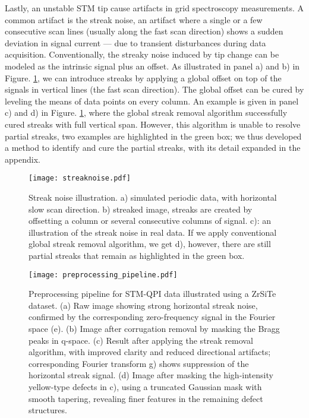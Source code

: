 Lastly, an unstable \ac{STM} tip cause artifacts in grid spectroscopy measurements. A common  artifact is the streak noise, an artifact where a single or a few consecutive scan lines (usually along the fast scan direction) shows a sudden deviation in signal current — due to transient disturbances during data acquisition. Conventionally, the streaky noise induced by tip change can be modeled as the intrinsic signal plus an offset. As illustrated in panel a) and b) in Figure. \ref{fig:streaks}, we can introduce streaks by applying a global offset on top of the signals in vertical lines (the fast scan direction). The global offset can be cured by leveling the means of data points on every column. An example is given in panel c) and d) in Figure. \ref{fig:streaks}, where the global streak removal algorithm successfully cured streaks with full vertical span. However, this algorithm is unable to resolve partial streaks, two examples are highlighted in the green box; we thus developed a method to identify and cure the partial streaks, with its detail expanded in the appendix.

\begin{figure}
	\texttt{[image: streaknoise.pdf]} 
	\centering
	\caption{Streak noise illustration. a) simulated periodic data, with horizontal slow scan direction. b) streaked image, streaks are created by offsetting a column or several consecutive columns of signal. c): an illustration of the streak noise in real data. If we apply conventional global streak removal algorithm, we get d), however, there are still partial streaks that remain as highlighted in the green box.}
	\label{fig:streaks}
\end{figure}

\begin{figure}
	\texttt{[image: preprocessing\_pipeline.pdf]} 
	\centering
	\caption{Preprocessing pipeline for STM-QPI data illustrated using a ZrSiTe dataset. (a) Raw image showing strong horizontal streak noise, confirmed by the corresponding zero-frequency signal in the Fourier space (e). (b) Image after corrugation removal by masking the Bragg peaks in q-space. (c) Result after applying the streak removal algorithm, with improved clarity and reduced directional artifacts; corresponding Fourier transform g) shows suppression of the horizontal streak signal. (d) Image after masking the high-intensity yellow-type defects in c), using a truncated Gaussian mask with smooth tapering, revealing finer features in the remaining defect structures.}
	\label{fig:pipeline}
\end{figure}

